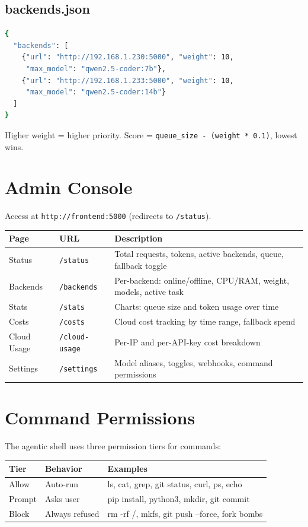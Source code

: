 \documentclass[11pt,a4paper]{article}
\begin{document}
\subsection{backends.json}
\begin{lstlisting}[language=bash]
{
  "backends": [
    {"url": "http://192.168.1.230:5000", "weight": 10,
     "max_model": "qwen2.5-coder:7b"},
    {"url": "http://192.168.1.233:5000", "weight": 10,
     "max_model": "qwen2.5-coder:14b"}
  ]
}
\end{lstlisting}
Higher weight = higher priority. Score = \texttt{queue\_size - (weight * 0.1)}, lowest wins.

\section{Admin Console}

Access at \texttt{http://frontend:5000} (redirects to \texttt{/status}).

\begin{longtable}{p{3cm}p{3cm}p{8cm}}
\toprule
\textbf{Page} & \textbf{URL} & \textbf{Description} \\
\midrule
Status & \texttt{/status} & Total requests, tokens, active backends, queue, fallback toggle \\
Backends & \texttt{/backends} & Per-backend: online/offline, CPU/RAM, weight, models, active task \\
Stats & \texttt{/stats} & Charts: queue size and token usage over time \\
Costs & \texttt{/costs} & Cloud cost tracking by time range, fallback spend \\
Cloud Usage & \texttt{/cloud-usage} & Per-IP and per-API-key cost breakdown \\
Settings & \texttt{/settings} & Model aliases, toggles, webhooks, command permissions \\
\bottomrule
\end{longtable}

\section{Command Permissions}

The agentic shell uses three permission tiers for commands:

\begin{longtable}{p{3cm}p{3cm}p{7.5cm}}
\toprule
\textbf{Tier} & \textbf{Behavior} & \textbf{Examples} \\
\midrule
Allow & Auto-run & ls, cat, grep, git status, curl, ps, echo \\
Prompt & Asks user & pip install, python3, mkdir, git commit \\
Block & Always refused & rm -rf /, mkfs, git push --force, fork bombs \\
\bottomrule
\end{longtable}
\end{document}

